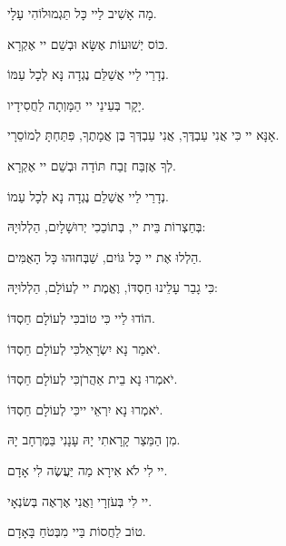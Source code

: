 {\begin{center}

מָה אָשִׁיב לַיי כָּל תַּגְמוּלוֹהִי עָלָי. 

כּוֹס יְשׁוּעוֹת אֶשָּׂא וּבְשֵׁם יי אֶקְרָא. 

נְדָרַי לַיי אֲשַׁלֵּם נֶגְדָה נָּא לְכָל עַמּוֹ. 

יָקָר בְּעֵינֵי יי הַמָּוְתָה לַחֲסִידָיו. 

אָנָּא יי כִּי אֲנִי עַבְדֶּךָ, אֲנִי עַבְדְּךָ בֶּן אֲמָתֶךָ, פִּתַּחְתָּ לְמוֹסֵרָי. 

לְךָ אֶזְבַּח זֶבַח תּוֹדָה וּבְשֵׁם יי אֶקְרָא. 

נְדָרַי לַיי אֲשַׁלֵם נֶגְדָה נָא לְכָל עַמוֹ. 

בְּחַצְרוֹת בֵּית יי, בְּתוֹכֵכִי יְרוּשָׁלָיִם, הַלְלוּיָהּ:

\break
הַלְלוּ אֶת יי כָּל גּוֹיִם, 
שַׁבְּחוּהוּ כָּל הָאֻמִּים. 

כִּי גָבַר עָלֵינוּ חַסְדּוֹ, 
וֶאֱמֶת יי לְעוֹלָם, הַלְלוּיָהּ:
\end{center}


\vspace{0.5em}
{\large
הוֹדוּ לַיי כִּי טוֹב\hfill כִּי לְעוֹלָם חַסְדּוֹ.

}

יֹאמַר נָא יִשְׂרָאֵל\hfill כִּי לְעוֹלָם חַסְדּוֹ.

יֹאמְרוּ נָא בֵית אַהֲרֹן\hfill כִּי לְעוֹלָם חַסְדּוֹ.

יֹאמְרוּ נָא יִרְאֵי יי\hfill כִּי לְעוֹלָם חַסְדּוֹ.

\vspace{0.5em}

מִן הַמֵּצַר קָרָאתִי יָהּ 
\hspace{2em}
עָנָנִי בַּמֶּרְחָב יָהּ. 

\hspace{1em}
יי לִי לֹא אִירָא 
\hspace{2em}
מַה יַּעֲשֶׂה לִי אָדָם. 

\hspace{2em}
יי לִי בְּעֹזְרָי 
\hspace{3em}
וַאֲנִי אֶרְאֶה בְּשׂנְאָי.

\hspace{3em} 
טוֹב לַחֲסוֹת בַּיי 
\hspace{2em}
מִבְּטֹחַ בָּאָדָם.
 
}
